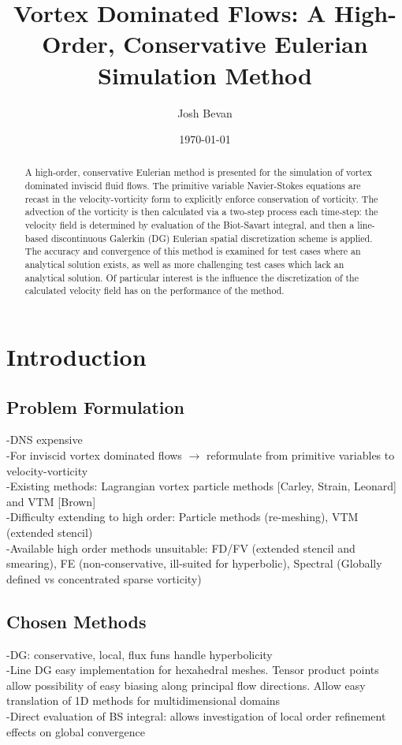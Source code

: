 \documentclass[letterpaper,12pt]{report}
\title{Vortex Dominated Flows: A High-Order, Conservative Eulerian Simulation Method}
\author{Josh Bevan}
\date{\today}
\begin{document}
\maketitle
\begin{abstract}
A high-order, conservative Eulerian method is presented for the simulation of vortex dominated inviscid fluid flows. The primitive variable Navier-Stokes equations are recast in the velocity-vorticity form to explicitly enforce conservation of vorticity. The advection of the vorticity is then calculated via a two-step process each time-step: the velocity field is determined by evaluation of the Biot-Savart integral, and then a line-based discontinuous Galerkin (DG) Eulerian spatial discretization scheme is applied. The accuracy and convergence of this method is examined for test cases where an analytical solution exists, as well as more challenging test cases which lack an analytical solution. Of particular interest is the influence the discretization of the calculated velocity field has on the performance of the method.
\end{abstract}

\section{Introduction}
\subsection{Problem Formulation}
-DNS expensive \\
-For inviscid vortex dominated flows $\rightarrow$ reformulate from primitive variables to velocity-vorticity \\
-Existing methods: Lagrangian vortex particle methods [Carley, Strain, Leonard] and VTM [Brown]\\
-Difficulty extending to high order: Particle methods (re-meshing), VTM (extended stencil)\\
-Available high order methods unsuitable: FD/FV (extended stencil and smearing), FE (non-conservative, ill-suited for hyperbolic), Spectral (Globally defined vs concentrated sparse vorticity)
\subsection{Chosen Methods}
-DG: conservative, local, flux funs handle hyperbolicity\\
-Line DG easy implementation for hexahedral meshes. Tensor product points allow possibility of easy biasing along principal flow directions. Allow easy translation of 1D methods for multidimensional domains\\
-Direct evaluation of BS integral: allows investigation of local order refinement effects on global convergence
\end{document}
